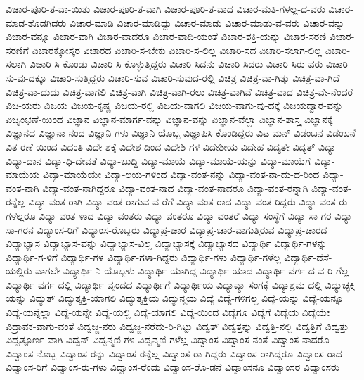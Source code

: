 {ವಿಚಾರ-ಪೂರಿ-ತ-ವಾ-ಯಿತು
ವಿಚಾರ-ಪೂರಿ-ತ-ವಾಗಿ
ವಿಚಾರ-ಪೂರಿ-ತ-ವಾದ
ವಿಚಾರ-ಮತಿ-ಗಳಲ್ಲ-ದ-ವರು
ವಿಚಾರ-ಮಾಡ-ತೊಡಗಿದರು
ವಿಚಾರ-ಮಾಡಿ
ವಿಚಾರ-ಮಾಡಿದ್ದು
ವಿಚಾರ-ಮಾಡು
ವಿಚಾರ-ಮಾಡು-ವ-ವರು
ವಿಚಾರ-ವನ್ನು
ವಿಚಾರ-ವನ್ನೂ
ವಿಚಾರ-ವಾಗಿ
ವಿಚಾರ-ವಾದರೂ
ವಿಚಾರ-ವಾದಿ-ಯಂತೆ
ವಿಚಾರ-ಶಕ್ತಿ-ಯನ್ನು
ವಿಚಾರ-ಸರಣಿ
ವಿಚಾರ-ಸರಣಿಗೆ
ವಿಚಾರಕ್ಕೋಸ್ಕರ
ವಿಚಾರದ
ವಿಚಾರಿ-ಸ-ಬೇಕು
ವಿಚಾರಿ-ಸ-ಲಿಲ್ಲ
ವಿಚಾರಿ-ಸದ
ವಿಚಾರಿ-ಸಲಾಗ-ಲಿಲ್ಲ
ವಿಚಾರಿ-ಸಲಾಗಿ
ವಿಚಾರಿ-ಸಿ-ಕೊಂಡು
ವಿಚಾರಿ-ಸಿ-ಕೊಳ್ಳುತ್ತಿದ್ದರು
ವಿಚಾರಿ-ಸಿದನು
ವಿಚಾರಿ-ಸಿದರು
ವಿಚಾರಿ-ಸಿರು-ವರು
ವಿಚಾರಿ-ಸು-ವು-ದಕ್ಕೂ
ವಿಚಾರಿ-ಸುತ್ತಿದ್ದರು
ವಿಚಾರಿ-ಸುವ
ವಿಚಾರಿ-ಸುವುದ-ರಲ್ಲಿ
ವಿಚಿತ್ರ
ವಿಚಿತ್ರ-ವಾ-ಗಿತ್ತು
ವಿಚಿತ್ರ-ವಾ-ಗಿದೆ
ವಿಚಿತ್ರ-ವಾ-ದುದು
ವಿಚಿತ್ರ-ವಾಗಲಿ
ವಿಚಿತ್ರ-ವಾಗಿ
ವಿಚಿತ್ರ-ವಾಗಿ-ರಲು
ವಿಚಿತ್ರ-ವಾಗಿವೆ
ವಿಚಿತ್ರ-ವಾದ
ವಿಚಿತ್ರ-ವೇ-ನೆಂದರೆ
ವಿಜ-ಯರು
ವಿಜಯ
ವಿಜಯ-ಕೃಷ್ಣ
ವಿಜಯ-ರಲ್ಲಿ
ವಿಜಯ-ವಾಗಲಿ
ವಿಜಯ-ವಾಗು-ವು-ದಕ್ಕೆ
ವಿಜಯದ್ವಾರ-ವನ್ನು
ವಿಜೃಂಭಣೆ-ಯಿಂದ
ವಿಜ್ಞಾನ
ವಿಜ್ಞಾನ-ಮಾರ್ಗ-ವನ್ನು
ವಿಜ್ಞಾನ-ವನ್ನು
ವಿಜ್ಞಾನ-ವೆಲ್ಲಾ
ವಿಜ್ಞಾನ-ಶಾಸ್ತ್ರ
ವಿಜ್ಞಾನಕ್ಕೆ
ವಿಜ್ಞಾನದ
ವಿಜ್ಞಾನಾ-ನಂದ
ವಿಜ್ಞಾನಿ-ಗಳು
ವಿಜ್ಞಾನಿ-ಯೊಬ್ಬ
ವಿಜ್ಞಾಪಿಸಿ-ಕೊಂಡಿದ್ದರು
ವಿಟ-ಮನ್
ವಿಡಂಬನ
ವಿಡಂಬನೆ
ವಿತ-ರಣೆ-ಯಿಂದ
ವಿದಂತಿ
ವಿದೇ-ಶಕ್ಕೆ
ವಿದೇಶ-ದಿಂದ
ವಿದೇಶಿ-ಗಳ
ವಿದೇಶೀಯ
ವಿದೇಹ
ವಿದ್ಯತೇ
ವಿದ್ಯತ್
ವಿದ್ಯಾ
ವಿದ್ಯಾ-ದಾನ
ವಿದ್ಯಾ-ಧಿ-ದೇವತೆ
ವಿದ್ಯಾ-ಬುದ್ಧಿ
ವಿದ್ಯಾ-ಮಾಯೆ
ವಿದ್ಯಾ-ಮಾಯೆ-ಯನ್ನು
ವಿದ್ಯಾ-ಮಾಯೆಗೆ
ವಿದ್ಯಾ-ಮಾಯೆಯ
ವಿದ್ಯಾ-ಮಾಯೆಯೇ
ವಿದ್ಯಾ-ಲಯ-ಗಳಿಂದ
ವಿದ್ಯಾ-ವಂತ-ನನ್ನು
ವಿದ್ಯಾ-ವಂತ-ನಾ-ದು-ದ-ರಿಂದ
ವಿದ್ಯಾ-ವಂತ-ನಾಗಿ
ವಿದ್ಯಾ-ವಂತ-ನಾಗಿದ್ದರೂ
ವಿದ್ಯಾ-ವಂತ-ನಾದ
ವಿದ್ಯಾ-ವಂತ-ನಾದರೂ
ವಿದ್ಯಾ-ವಂತ-ರನ್ನಾಗಿ
ವಿದ್ಯಾ-ವಂತ-ರನ್ನೆಲ್ಲ
ವಿದ್ಯಾ-ವಂತ-ರಾಗಿ
ವಿದ್ಯಾ-ವಂತ-ರಾಗುವ-ವ-ರೆಗೆ
ವಿದ್ಯಾ-ವಂತ-ರಾದ
ವಿದ್ಯಾ-ವಂತ-ರಿದ್ದರು
ವಿದ್ಯಾ-ವಂತ-ರು-ಗಳೆಲ್ಲರೂ
ವಿದ್ಯಾ-ವಂತ-ಳಾದ
ವಿದ್ಯಾ-ವಂತರು
ವಿದ್ಯಾ-ವಂತರೂ
ವಿದ್ಯಾ-ವಂತರೆ
ವಿದ್ಯಾ-ಸಂಸ್ಥೆಗೆ
ವಿದ್ಯಾ-ಸಾ-ಗರ
ವಿದ್ಯಾ-ಸಾ-ಗರನ
ವಿದ್ಯಾಂಸ-ರಿಗೆ
ವಿದ್ಯಾಂಸ-ರೊಬ್ಬರು
ವಿದ್ಯಾಪ್ರ-ಚಾರ
ವಿದ್ಯಾಪ್ರ-ಚಾರ-ವಾಗುತ್ತಿರುವ
ವಿದ್ಯಾಪ್ರ-ಚಾರದ
ವಿದ್ಯಾಭ್ಯಾಸ
ವಿದ್ಯಾಭ್ಯಾಸ-ವನ್ನು
ವಿದ್ಯಾಭ್ಯಾಸ-ವಿಲ್ಲ
ವಿದ್ಯಾಭ್ಯಾಸಕ್ಕೆ
ವಿದ್ಯಾಭ್ಯಾಸದ
ವಿದ್ಯಾರ್ಥಿ
ವಿದ್ಯಾರ್ಥಿ-ಗಳನ್ನು
ವಿದ್ಯಾರ್ಥಿ-ಗ-ಳಿಗೆ
ವಿದ್ಯಾರ್ಥಿ-ಗಳ
ವಿದ್ಯಾರ್ಥಿ-ಗಳಾ-ಗಿದ್ದರು
ವಿದ್ಯಾರ್ಥಿ-ಗಳು
ವಿದ್ಯಾರ್ಥಿ-ಗಳೆಲ್ಲ
ವಿದ್ಯಾರ್ಥಿ-ದೆಸೆ-ಯಲ್ಲಿರು-ವಾಗಲೇ
ವಿದ್ಯಾರ್ಥಿ-ನಿ-ಯೊಬ್ಬಳು
ವಿದ್ಯಾರ್ಥಿ-ಯಾಗಿದ್ದ
ವಿದ್ಯಾರ್ಥಿ-ಯಾದ
ವಿದ್ಯಾರ್ಥಿ-ವರ್ಗ-ದ-ವ-ರಿ-ಗೆಲ್ಲ
ವಿದ್ಯಾರ್ಥಿ-ವರ್ಗ-ದಲ್ಲಿ
ವಿದ್ಯಾರ್ಥಿ-ವೃಂದದ
ವಿದ್ಯಾರ್ಥಿಗೆ
ವಿದ್ಯಾರ್ಥಿಯ
ವಿದ್ಯಾವ್ಯಾ-ಸಂಗಕ್ಕೆ
ವಿದ್ಯಾಶ್ರಮ-ದಲ್ಲಿ
ವಿದ್ಯುಚ್ಛಕ್ತಿ-ಯನ್ನು
ವಿದ್ಯುತ್
ವಿದ್ಯುತ್ಶಕ್ತಿ-ಯಾಗಲಿ
ವಿದ್ಯುತ್ಶಕ್ತಿಯ
ವಿದ್ಯುನ್ಮಯ
ವಿದ್ಯೆ
ವಿದ್ಯೆ-ಗಳಿಗಲ್ಲ
ವಿದ್ಯೆ-ಯನ್ನು
ವಿದ್ಯೆ-ಯನ್ನೂ
ವಿದ್ಯೆ-ಯನ್ನೆಲ್ಲಾ
ವಿದ್ಯೆ-ಯನ್ನೇ
ವಿದ್ಯೆ-ಯಲ್ಲಿ
ವಿದ್ಯೆ-ಯಾಗಲಿ
ವಿದ್ಯೆ-ಯಿಂದ
ವಿದ್ಯೆಗೂ
ವಿದ್ಯೆಗೆ
ವಿದ್ಯೆಯ
ವಿದ್ಯೆಯೇ
ವಿದ್ರಾವಕ-ವಾಗು-ವಂತೆ
ವಿದ್ವಜ್ಜ-ನರು
ವಿದ್ವಜ್ಜ-ನರೆದು-ರಿ-ಗಿಟ್ಟು
ವಿದ್ವತ್
ವಿದ್ವತ್ತನ್ನು
ವಿದ್ವತ್ತಿ-ನಲ್ಲಿ
ವಿದ್ವತ್ತಿಗೆ
ವಿದ್ವತ್ತು
ವಿದ್ವತ್ಪೂರ್ಣ-ವಾಗಿ
ವಿದ್ವನ್
ವಿದ್ವನ್ಮಣಿ-ಗಳ
ವಿದ್ವನ್ಮಣಿ-ಗಳೆಲ್ಲ
ವಿದ್ವಾಂಸ
ವಿದ್ವಾಂಸ-ನಂತೆ
ವಿದ್ವಾಂಸ-ನಾದರೊ
ವಿದ್ವಾಂಸ-ನೊಬ್ಬ
ವಿದ್ವಾಂಸ-ರನ್ನು
ವಿದ್ವಾಂಸ-ರನ್ನೆಲ್ಲ
ವಿದ್ವಾಂಸ-ರಾ-ಗಿದ್ದರು
ವಿದ್ವಾಂಸ-ರಾಗಿದ್ದರೂ
ವಿದ್ವಾಂಸ-ರಾದ
ವಿದ್ವಾಂಸ-ರಿಗೆ
ವಿದ್ವಾಂಸ-ರು-ಗಳು
ವಿದ್ವಾಂಸ-ರೆಂದು
ವಿದ್ವಾಂಸ-ರೊ-ಡನೆ
ವಿದ್ವಾಂಸನೂ
ವಿದ್ವಾಂಸರ
ವಿದ್ವಾಂಸರು
}
